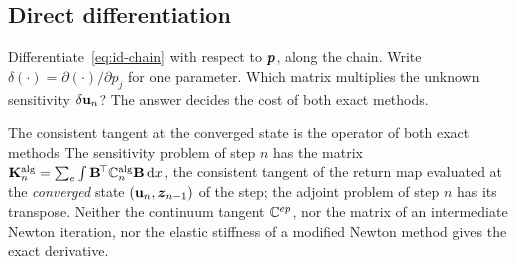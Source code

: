 \subsection{Direct differentiation}\label{ssec:id-path-ddm}
%
Differentiate~\eqref{eq:id-chain} with respect to $\bm{p}$, along the chain.
Write $\delta(\cdot)=\partial(\cdot)/\partial p_j$ for one parameter.
Which matrix multiplies the unknown sensitivity $\delta\mathbf{u}_n$? The answer
decides the cost of both exact methods.

\begin{gbox}{The consistent tangent at the converged state is the operator of both exact methods}\label{prop:id-ctan}
The sensitivity problem of step $n$ has the matrix
$\mathbf{K}^{\mathrm{alg}}_n=\sum_e\int\mathbf{B}^{\!\top}\mathbb{C}^{\mathrm{alg}}_n\mathbf{B}\,\mathrm{d} x$, the consistent
tangent of the return map evaluated at the \emph{converged} state
$(\mathbf{u}_n,\bm{z}_{n-1})$ of the step; the adjoint problem of step $n$ has its
transpose. Neither the continuum tangent $\mathbb{C}^{ep}$, nor the matrix of an
intermediate Newton iteration, nor the elastic stiffness of a modified Newton
method gives the exact derivative.
\end{gbox}
